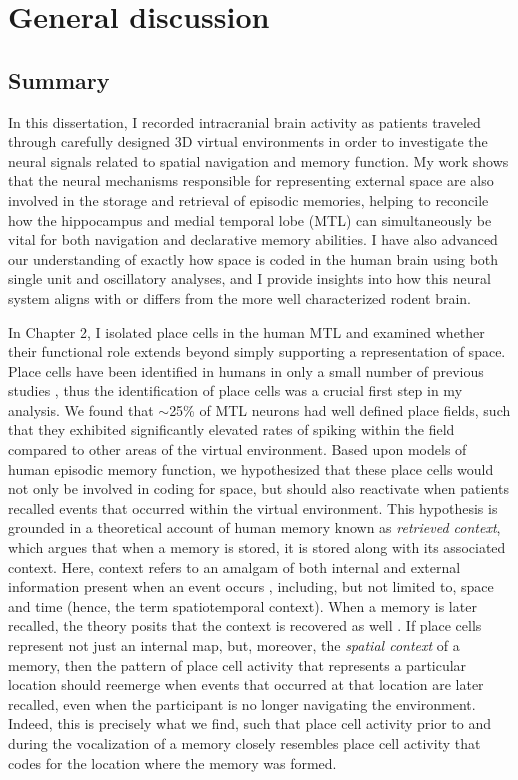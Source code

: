 \chapter{General discussion}
\large

\section{Summary}

In this dissertation, I recorded intracranial brain activity as patients traveled through carefully designed 3D virtual environments in order to investigate the neural signals related to spatial navigation and memory function. My work shows that the neural mechanisms responsible for representing external space are also involved in the storage and retrieval of episodic memories, helping to reconcile how the hippocampus and medial temporal lobe (MTL) can simultaneously be vital for both navigation and declarative memory abilities. I have also advanced our understanding of exactly how space is coded in the human brain using both single unit and oscillatory analyses, and I provide insights into how this neural system aligns with or differs from the more well characterized rodent brain. 

In Chapter 2, I isolated place cells in the human MTL and examined whether their functional role extends beyond simply supporting a representation of space. Place cells have been identified in humans in only a small number of previous studies \citep{EkstEtal03,JacoEtal10}, thus the identification of place cells was a crucial first step in my analysis. We found that $\sim$25\% of MTL neurons had well defined place fields, such that they exhibited significantly elevated rates of spiking within the field compared to other areas of the virtual environment. Based upon models of human episodic memory function, we hypothesized that these place cells would not only be involved in coding for space, but should also reactivate when patients recalled events that occurred within the virtual environment. This hypothesis is grounded in a theoretical account of human memory known as \textit{retrieved context}, which argues that when a memory is stored, it is stored along with its associated context. Here, context refers to an amalgam of both internal and external information present when an event occurs \citep{McGe42,Bowe72}, including, but not limited to, space and time (hence, the term spatiotemporal context). When a memory is later recalled, the theory posits that the context is recovered as well \citep{HowaKaha02a,PolyEtalTulv,LohnKaha13a}. If place cells represent not just an internal map, but, moreover, the \textit{spatial context} of a memory, then the pattern of place cell activity that represents a particular location should reemerge when events that occurred at that location are later recalled, even when the participant is no longer navigating the environment. Indeed, this is precisely what we find, such that place cell activity prior to and during the vocalization of a memory closely resembles place cell activity that codes for the location where the memory was formed.

